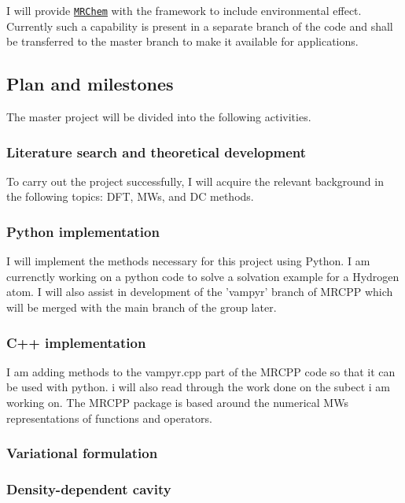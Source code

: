 \documentclass[a4paper,11pt]{article}
\newcommand{\mrchem}{\href{https://mrchem.readthedocs.io/en/latest/}{\texttt{MRChem}}}
\begin{document}
I will provide \mrchem{} with the
framework to include environmental effect. Currently such a capability
is present in a separate branch of the code and shall be transferred
to the master branch to make it available for applications.

\subsection{Plan and milestones}

The master project will be divided into the following activities.

\subsubsection{Literature search and theoretical development}

To carry out the project successfully, I will acquire the relevant
background in the following topics: \acl{DFT}, \aclp{MW}, and \acl{DC}
methods.

\subsubsection{Python implementation}

I will implement the methods necessary for this project using Python.
I am currenctly working on a python code to solve a solvation example for a Hydrogen atom. I will also assist in development of the 'vampyr' branch of MRCPP which will be merged with the main branch of the group later.

\subsubsection{C++ implementation}
I am adding methods to the vampyr.cpp part of the MRCPP code so that it can be used with python. i will also read through the work done on the subect i am working on. The MRCPP package is based around the numerical \aclp{MW} representations of functions and operators.

\subsubsection{Variational formulation}

\subsubsection{Density-dependent cavity}
\end{document}
